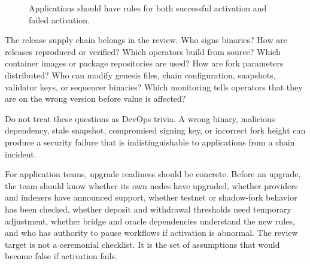 \begin{figure}[htbp]
\centering
{}
\caption{Applications should have rules for both successful activation and failed activation.}
\end{figure}

The release supply chain belongs in the review. Who signs binaries? How are releases reproduced or verified? Which operators build from source? Which container images or package repositories are used? How are fork parameters distributed? Who can modify genesis files, chain configuration, snapshots, validator keys, or sequencer binaries? Which monitoring tells operators that they are on the wrong version before value is affected?

Do not treat these questions as DevOps trivia. A wrong binary, malicious dependency, stale snapshot, compromised signing key, or incorrect fork height can produce a security failure that is indistinguishable to applications from a chain incident.

For application teams, upgrade readiness should be concrete. Before an upgrade, the team should know whether its own nodes have upgraded, whether providers and indexers have announced support, whether testnet or shadow-fork behavior has been checked, whether deposit and withdrawal thresholds need temporary adjustment, whether bridge and oracle dependencies understand the new rules, and who has authority to pause workflows if activation is abnormal. The review target is not a ceremonial checklist. It is the set of assumptions that would become false if activation fails.

